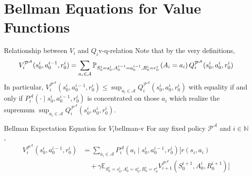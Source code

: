 \documentclass[a4paper, 11pt]{article}
\numberwithin{equation}{section}
\theoremstyle{plain}
\theoremstyle{definition}
\newcommand{\E}{{\mathbb E}}
\newcommand{\1}{{\mathbbm 1}}
\newcommand{\mc}[1]{\mathcal{#1}}
\newcommand{\N}{{\mathbb{N}}}
\begin{document}
	\section{Bellman Equations for Value Functions}
	
	\begin{frema}{Relationship between $V_i$ and $Q_i$}{v-q-relation}
		Note that by the very definitions,
		\begin{equation}\label{v-from-q}
			V_i^{\mc{P}^\mc{A}}(s_0^i, a_0^{i - 1}, r_0^i) = \sum_{a_i \in \mc{A}} \pof[A_i = a_i][S_0^i = s_0^i, A_0^{i - 1} = a_0^{i - 1}, R_0^i = r_0^i] Q^{\mc{P}^\mc{A}}_i(s_0^i, a_0^{i}, r_0^i) 
		\end{equation}
		In particular, $V_i^{\mc{P}^\mc{A}}(s_0^i, a_0^{i - 1}, r_0^i) \le \sup_{a_i \in \mc{A}} Q_i^{\mc{P}^\mc{A}}(s_0^i, a_0^{i}, r_0^i)$ with equality if and only if $P^{\mc{A}}_i(\cdot\;|\; s_0^i, a_0^{i - 1}, r_0^i)$ is concentrated on those $a_i$ which realize the supremum $\sup_{a_i \in \mc{A}} Q_i^{\mc{P}^\mc{A}}(s_0^i, a_0^{i}, r_0^i)$.
	\end{frema}
	
	\begin{fprop}{Bellman Expectation Equation for $V_i$}{bellman-v}
		For any fixed policy $\mc{P}^{\mc{A}}$ and $i \in \N$,
		\begin{equation}\label{recurrence vi}
			\begin{split}
				V_i^{\mc{P}^\mc{A}}(s_0^i, a_0^{i-1}, r_0^i) &= \sum_{a_i \in \mc{A}} P^{\mc{A}}_i(a_i\;|\; s_0^i, a_0^{i-1}, r_0^i) \Big[ r(s_i, a_i) \\
				&\quad + \gamma\E_{S_0^i = s_0^i, A_0^{i} = a_0^{i}, R_0^i = r_0^i} V_{i + 1}^{\mc{P}^\mc{A}}(S_0^{i+1}, A_0^{i}, R_0^{i+1}) \Big]
			\end{split}
		\end{equation}
	\end{fprop}
	
\end{document}
